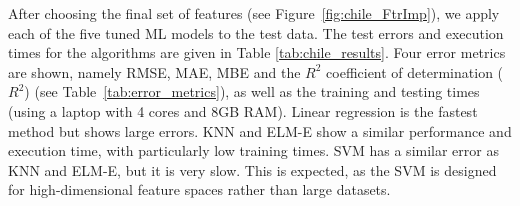After choosing the final set of features (see Figure~\ref{fig:chile_FtrImp}), we apply each of the five tuned ML models to the test data. 
The test errors and execution times for the algorithms are given in Table  \ref{tab:chile_results}. Four error metrics are shown, namely RMSE, MAE, MBE and the $R^2$ coefficient of determination ($R^2$) (see Table~\ref{tab:error_metrics}), as well as the training and testing times (using a laptop with 4 cores and 8GB RAM). Linear regression is the fastest method but shows large errors. KNN and ELM-E show a similar performance and execution time, with particularly low training times. SVM has a similar error as KNN and ELM-E, but it is very slow. This is expected, as the SVM is designed for high-dimensional feature spaces rather than large datasets. 

